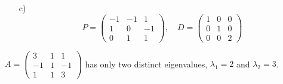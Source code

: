 {\begin{enumerate}
        A vector that is a basis for the eigenspace is $$v_3 = \begin{pmatrix} 1\\-1\\1\end{pmatrix}$$ But any non-zero multiple is also ok. 
        \item[c)] $$P = \begin{pmatrix} -1&-1&1\\1&0&-1\\0&1&1\end{pmatrix}, \quad D = \begin{pmatrix} 1&0&0\\0&1&0\\0&0&2\end{pmatrix}$$
    \end{enumerate}
    } 
   \fi
\fi 


\ifnum {}
    \question[3] $A = \begin{pmatrix}3&1&1\\-1&1&-1\\1&1&3 \end{pmatrix}$ has only two distinct eigenvalues, $\lambda_1 = 2$ and $\lambda_2 = 3$.   

